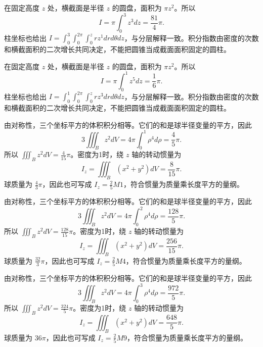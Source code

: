 \documentclass[12pt,fontset=fandol]{ctexart}
\begin{document}
\begin{solve}\label{ans:c39q5}
在固定高度 $z$ 处，横截面是半径 $z$ 的圆盘，面积为 $\pi z^2$。所以
\[
I=\pi\int_0^{3}z^{3}dz=\frac{81}{4}\pi.
\]
柱坐标也给出 $I=\int_0^{3}\int_0^{2\pi}\int_0^zr z^{1}drd\theta dz$，与分层解释一致。积分指数由密度的次数和横截面积的二次增长共同决定，不能把圆锥当成截面面积固定的圆柱。
\end{solve}

\begin{solve}\label{ans:c39q6}
在固定高度 $z$ 处，横截面是半径 $z$ 的圆盘，面积为 $\pi z^2$。所以
\[
I=\pi\int_0^{1}z^{5}dz=\frac{1}{6}\pi.
\]
柱坐标也给出 $I=\int_0^{1}\int_0^{2\pi}\int_0^zr z^{3}drd\theta dz$，与分层解释一致。积分指数由密度的次数和横截面积的二次增长共同决定，不能把圆锥当成截面面积固定的圆柱。
\end{solve}

\begin{solve}\label{ans:c39q7}
由对称性，三个坐标平方的体积积分相等。它们的和是球半径变量的平方，因此
\[
3\iiint_Bz^2dV=4\pi\int_0^{1}\rho^4d\rho=\frac{4}{5}\pi.
\]
所以 $\iiint_Bz^2dV=\frac{4}{15}\pi$。密度为1时，绕 $z$ 轴的转动惯量为
\[
I_z=\iiint_B(x^2+y^2)dV=\frac{8}{15}\pi.
\]
球质量为 $\frac{4}{3}\pi$，因此也可写成 $I_z=\frac25M1$，符合惯量为质量乘长度平方的量纲。
\end{solve}

\begin{solve}\label{ans:c39q8}
由对称性，三个坐标平方的体积积分相等。它们的和是球半径变量的平方，因此
\[
3\iiint_Bz^2dV=4\pi\int_0^{2}\rho^4d\rho=\frac{128}{5}\pi.
\]
所以 $\iiint_Bz^2dV=\frac{128}{15}\pi$。密度为1时，绕 $z$ 轴的转动惯量为
\[
I_z=\iiint_B(x^2+y^2)dV=\frac{256}{15}\pi.
\]
球质量为 $\frac{32}{3}\pi$，因此也可写成 $I_z=\frac25M4$，符合惯量为质量乘长度平方的量纲。
\end{solve}

\begin{solve}\label{ans:c39q9}
由对称性，三个坐标平方的体积积分相等。它们的和是球半径变量的平方，因此
\[
3\iiint_Bz^2dV=4\pi\int_0^{3}\rho^4d\rho=\frac{972}{5}\pi.
\]
所以 $\iiint_Bz^2dV=\frac{324}{5}\pi$。密度为1时，绕 $z$ 轴的转动惯量为
\[
I_z=\iiint_B(x^2+y^2)dV=\frac{648}{5}\pi.
\]
球质量为 $36\pi$，因此也可写成 $I_z=\frac25M9$，符合惯量为质量乘长度平方的量纲。
\end{solve}
\end{document}
